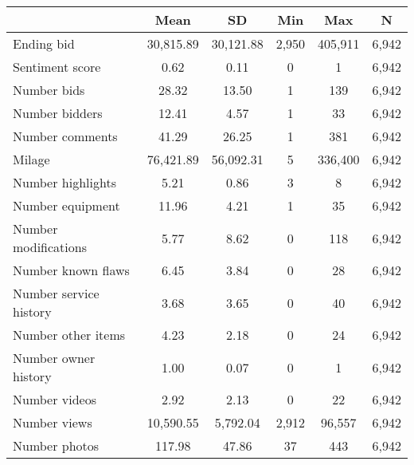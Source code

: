 {
\def\sym#1{\ifmmode^{#1}\else\(^{#1}\)\fi}
\begin{tabular}{l*{1}{ccccc}}
\toprule
                    &        Mean&          SD&         Min&         Max&           N\\
\midrule
Ending bid          &   30,815.89&   30,121.88&       2,950&     405,911&       6,942\\
Sentiment score     &        0.62&        0.11&           0&           1&       6,942\\
Number bids         &       28.32&       13.50&           1&         139&       6,942\\
Number bidders      &       12.41&        4.57&           1&          33&       6,942\\
Number comments     &       41.29&       26.25&           1&         381&       6,942\\
Milage              &   76,421.89&   56,092.31&           5&     336,400&       6,942\\
Number highlights   &        5.21&        0.86&           3&           8&       6,942\\
Number equipment    &       11.96&        4.21&           1&          35&       6,942\\
Number modifications&        5.77&        8.62&           0&         118&       6,942\\
Number known flaws  &        6.45&        3.84&           0&          28&       6,942\\
Number service history&        3.68&        3.65&           0&          40&       6,942\\
Number other items  &        4.23&        2.18&           0&          24&       6,942\\
Number owner history&        1.00&        0.07&           0&           1&       6,942\\
Number videos       &        2.92&        2.13&           0&          22&       6,942\\
Number views        &   10,590.55&    5,792.04&       2,912&      96,557&       6,942\\
Number photos       &      117.98&       47.86&          37&         443&       6,942\\
\bottomrule
\end{tabular}
}
